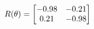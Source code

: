\documentclass[preview]{standalone}
\begin{document}
\begin{align*}
\special{dvisvgm:raw <g id='unique000'>}R(\theta) = \begin{bmatrix}-0.98 & -0.21\\0.21 & -0.98\end{bmatrix}\special{dvisvgm:raw </g>}
\end{align*}
\end{document}
